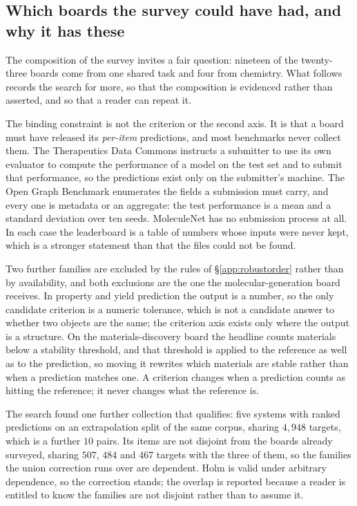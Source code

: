 \subsection{Which boards the survey could have had, and why it has these}
\label{app:boardsearch}

The composition of the survey invites a fair question: nineteen of the twenty-three boards come from
one shared task and four from chemistry. What follows records the search for more, so that the
composition is evidenced rather than asserted, and so that a reader can repeat it.

The binding constraint is not the criterion or the second axis. It is that a board must have
released its \emph{per-item} predictions, and most benchmarks never collect them. The Therapeutics
Data Commons instructs a submitter to use its own evaluator to compute the performance of a model on
the test set and to submit that performance, so the predictions exist only on the submitter's
machine. The Open Graph Benchmark enumerates the fields a submission must carry, and every one is
metadata or an aggregate: the test performance is a mean and a standard deviation over ten seeds.
MoleculeNet has no submission process at all. In each case the leaderboard is a table of numbers
whose inputs were never kept, which is a stronger statement than that the files could not be found.

Two further families are excluded by the rules of \S\ref{app:robustorder} rather than by
availability, and both exclusions are the one the molecular-generation board receives. In property
and yield prediction the output is a number, so the only candidate criterion is a numeric tolerance,
which is not a candidate answer to whether two objects are the same; the criterion axis exists only
where the output is a structure. On the materials-discovery board the headline counts materials
below a stability threshold, and that threshold is applied to the reference as well as to the
prediction, so moving it rewrites which materials are stable rather than when a prediction matches
one. A criterion changes when a prediction counts as hitting the reference; it never changes what
the reference is.

The search found one further collection that qualifies: five systems with ranked predictions on an
extrapolation split of the same corpus, sharing $4{,}948$ targets, which is a further $10$ pairs.
Its items are not disjoint from the boards already surveyed, sharing $507$, $484$ and $467$ targets
with the three of them, so the families the union correction runs over are dependent. Holm is valid
under arbitrary dependence, so the correction stands; the overlap is reported because a reader is
entitled to know the families are not disjoint rather than to assume it.

